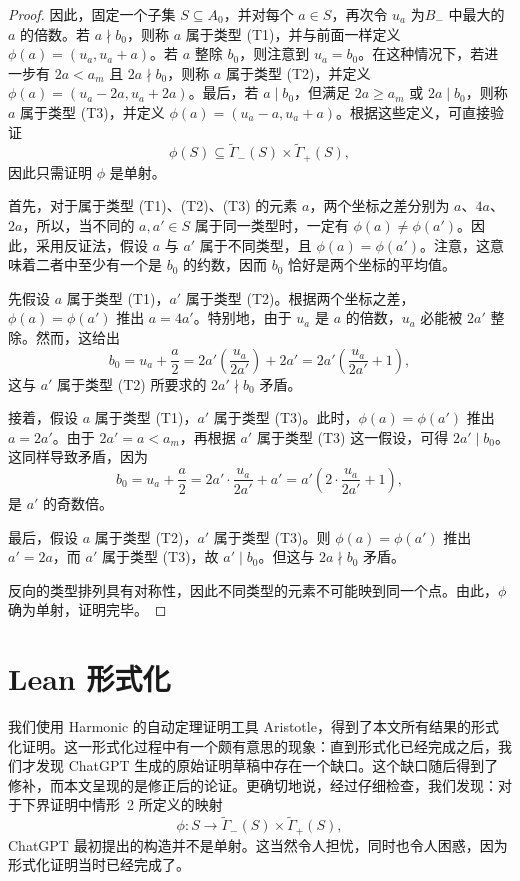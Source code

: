 \documentclass[UTF8,a4paper,oneside,openany,fontset=fandol,zihao=-4]{ctexbook}
\theoremstyle{chinesestyle}
\begin{document}
\begin{proof}
因此，固定一个子集 $S\subseteq A_0$，并对每个 $a\in S$，再次令 $u_a$ 为$B_-$ 中最大的 $a$ 的倍数。若 $a\nmid b_0$，则称 $a$ 属于类型 (T1)，并与前面一样定义 $\phi(a)=(u_a,u_a+a)$。若 $a$ 整除 $b_0$，则注意到 $u_a=b_0$。在这种情况下，若进一步有 $2a<a_m$ 且 $2a\nmid b_0$，则称 $a$ 属于类型 (T2)，并定义 $\phi(a)=(u_a-2a,u_a+2a)$。最后，若 $a\mid b_0$，但满足 $2a\geq a_m$ 或 $2a\mid b_0$，则称 $a$ 属于类型 (T3)，并定义 $\phi(a)=(u_a-a,u_a+a)$。根据这些定义，可直接验证
\[
  \phi(S)\subseteq
    \widetilde\Gamma_-(S)\times\widetilde\Gamma_+(S),
\]
因此只需证明 $\phi$ 是单射。

首先，对于属于类型 (T1)、(T2)、(T3) 的元素 $a$，两个坐标之差分别为 $a$、$4a$、$2a$，所以，当不同的 $a,a'\in S$ 属于同一类型时，一定有 $\phi(a)\neq\phi(a')$。因此，采用反证法，假设 $a$ 与 $a'$ 属于不同类型，且 $\phi(a)=\phi(a')$。注意，这意味着二者中至少有一个是 $b_0$ 的约数，因而 $b_0$ 恰好是两个坐标的平均值。

先假设 $a$ 属于类型 (T1)，$a'$ 属于类型 (T2)。根据两个坐标之差，$\phi(a)=\phi(a')$ 推出 $a=4a'$。特别地，由于 $u_a$ 是 $a$ 的倍数，$u_a$ 必能被 $2a'$ 整除。然而，这给出
\[
  b_0=u_a+\frac a2
    =2a'\left(\frac{u_a}{2a'}\right)+2a'
    =2a'\left(\frac{u_a}{2a'}+1\right),
\]
这与 $a'$ 属于类型 (T2) 所要求的 $2a'\nmid b_0$ 矛盾。

接着，假设 $a$ 属于类型 (T1)，$a'$ 属于类型 (T3)。此时，$\phi(a)=\phi(a')$ 推出 $a=2a'$。由于 $2a'=a<a_m$，再根据 $a'$ 属于类型 (T3) 这一假设，可得 $2a'\mid b_0$。这同样导致矛盾，因为
\[
  b_0=u_a+\frac a2
    =2a'\cdot\frac{u_a}{2a'}+a'
    =a'\left(2\cdot\frac{u_a}{2a'}+1\right),
\]
是 $a'$ 的奇数倍。

最后，假设 $a$ 属于类型 (T2)，$a'$ 属于类型 (T3)。则 $\phi(a)=\phi(a')$ 推出 $a'=2a$，而 $a'$ 属于类型 (T3)，故 $a'\mid b_0$。但这与 $2a\nmid b_0$ 矛盾。

反向的类型排列具有对称性，因此不同类型的元素不可能映到同一个点。由此，$\phi$ 确为单射，证明完毕。
\end{proof}

\section{Lean 形式化}
\label{sec:lean}

我们使用 Harmonic 的自动定理证明工具 Aristotle，得到了本文所有结果的形式化证明。这一形式化过程中有一个颇有意思的现象：直到形式化已经完成之后，我们才发现 ChatGPT 生成的原始证明草稿中存在一个缺口。这个缺口随后得到了修补，而本文呈现的是修正后的论证。更确切地说，经过仔细检查，我们发现：对于下界证明中情形~2 所定义的映射
\[
  \phi\colon S\longrightarrow
  \widetilde{\Gamma}_{-}(S)\times\widetilde{\Gamma}_{+}(S),
\]
ChatGPT 最初提出的构造并不是单射。这当然令人担忧，同时也令人困惑，因为形式化证明当时已经完成了。
\end{document}
